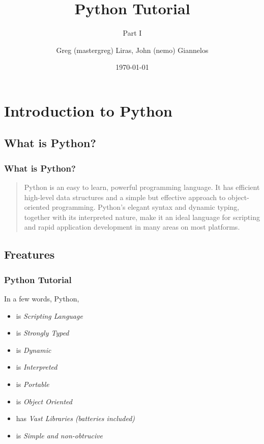 \documentclass{beamer}
\author[nemo,mastergreg]{Greg (mastergreg) Liras, John (nemo) Giannelos}
\institute{foss.ntua}
\title{Python Tutorial}
\subtitle{Part I}
\date{\today}
\begin{document}
\begin{frame}
	\titlepage
\end{frame}


\section{Introduction to Python}

\subsection{What is Python?}
\begin{frame}
	\frametitle{What is Python?}
\begin{quote}
Python is an easy to learn, powerful programming language. It has efficient
high-level data structures and a simple but effective approach to
object-oriented programming. Python’s elegant syntax and dynamic typing,
together with its interpreted nature, make it an ideal language for scripting
and rapid application development in many areas on most platforms.
\end{quote}
\end{frame}

\subsection{Freatures}
\begin{frame}
	\frametitle{Python Tutorial}

In a few words, Python,
\begin{itemize}
\item<1-> is \emph{Scripting Language}
\item<2-> is \emph{Strongly Typed}
\item<3-> is \emph{Dynamic}
\item<4-> is \emph{Interpreted}
\item<5-> is \emph{Portable}
\item<6-> is \emph{Object Oriented}
\item<7-> has \emph{Vast Libraries (batteries included)}
\item<8-> is \emph{Simple and non-obtrucive}
\end{itemize}

\end{frame}
\end{document}
